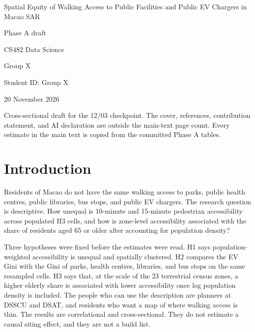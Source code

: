 \documentclass[11pt,a4paper]{article}
\begin{document}
\begin{titlepage}
\centering
\vspace*{24mm}
{\Large Spatial Equity of Walking Access to Public Facilities and Public EV Chargers in Macao SAR\par}
\vspace{1em}
{\large Phase A draft\par}
\vspace{1em}
CS482 Data Science\par
Group X\par
Student ID: Group X\par
\vspace{1em}
20 November 2026\par
\vspace{2em}
\begin{minipage}{\textwidth}
\raggedright
Cross-sectional draft for the 12/03 checkpoint. The cover, references, contribution statement, and AI declaration are outside the main-text page count. Every estimate in the main text is copied from the committed Phase A tables.
\end{minipage}
\end{titlepage}

\section{Introduction}
Residents of Macao do not have the same walking access to parks, public health centres, public libraries, bus stops, and public EV chargers. The research question is descriptive. How unequal is 10-minute and 15-minute pedestrian accessibility across populated H3 cells, and how is zone-level accessibility associated with the share of residents aged 65 or older after accounting for population density?

Three hypotheses were fixed before the estimates were read. H1 says population-weighted accessibility is unequal and spatially clustered. H2 compares the EV Gini with the Gini of parks, health centres, libraries, and bus stops on the same resampled cells. H3 says that, at the scale of the 23 terrestrial census zones, a higher elderly share is associated with lower accessibility once log population density is included. The people who can use the description are planners at DSSCU and DSAT, and residents who want a map of where walking access is thin. The results are correlational and cross-sectional. They do not estimate a causal siting effect, and they are not a build list.
\end{document}
